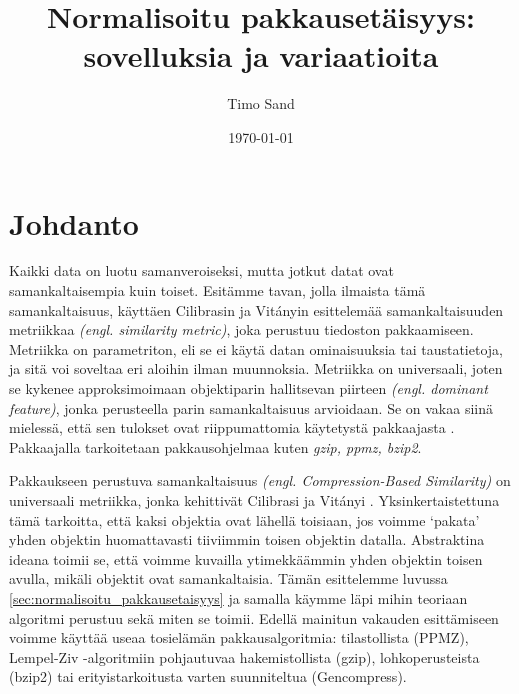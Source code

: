 \documentclass[12pt,finnish]{tktltiki2}
\title{Normalisoitu pakkausetäisyys: \\
sovelluksia ja variaatioita}
\author{Timo Sand}
\date{\today}
\theoremstyle{definition}
\theoremstyle{remark}
\newcommand{\engl}[1]{\emph{(engl. #1)}}
\begin{document}

\frontmatter      %

\maketitle        %
\makeabstract     %

\tableofcontents  %


\mainmatter       %

\section{Johdanto} %
\label{sec:johdanto}
\label{par:intro-1}
  Kaikki data on luotu samanveroiseksi, mutta jotkut datat ovat samankaltaisempia kuin toiset.
  Esitämme tavan, jolla ilmaista tämä samankaltaisuus, käyttäen Cilibrasin ja Vit{\'a}nyin esittelemää samankaltaisuuden metriikkaa \engl{similarity metric}, joka perustuu tiedoston pakkaamiseen. \cite{CV05}
  Metriikka on parametriton, eli se ei käytä datan ominaisuuksia tai taustatietoja, ja sitä voi soveltaa eri aloihin ilman muunnoksia.
  Metriikka on universaali, joten se kykenee approksimoimaan objektiparin hallitsevan piirteen \engl{dominant feature}, jonka perusteella parin samankaltaisuus arvioidaan.
  Se on vakaa siinä mielessä, että sen tulokset ovat riippumattomia käytetystä pakkaajasta \cite{CV05}. Pakkaajalla tarkoitetaan pakkausohjelmaa kuten \emph{gzip, ppmz, bzip2}.

  \label{par:intro-2}
  Pakkaukseen perustuva samankaltaisuus \engl{Compression-Based Similarity} on universaali metriikka, jonka kehittivät Cilibrasi ja Vit{\'a}nyi \cite{CV05}.
  Yksinkertaistettuna tämä tarkoitta, että kaksi objektia ovat lähellä toisiaan, jos voimme `pakata' yhden objektin huomattavasti tiiviimmin toisen objektin datalla.
  Abstraktina ideana toimii se, että voimme kuvailla ytimekkäämmin yhden objektin toisen avulla, mikäli objektit ovat samankaltaisia.
  Tämän esittelemme luvussa \ref{sec:normalisoitu_pakkausetaisyys} ja samalla käymme läpi mihin teoriaan algoritmi perustuu sekä miten se toimii.
  Edellä mainitun vakauden esittämiseen voimme käyttää useaa tosielämän pakkausalgoritmia: tilastollista (PPMZ), Lempel-Ziv -algoritmiin pohjautuvaa hakemistollista (gzip), lohkoperusteista (bzip2) tai erityistarkoitusta varten suunniteltua (Gencompress).
\end{document}
